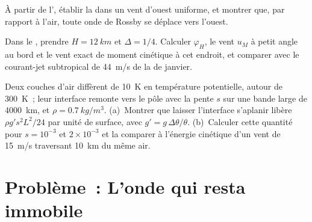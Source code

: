 \begin{exercise}[$\star\star\star$]\label{exo:b3:atmospheric-dynamics:10}
À partir de l', établir la  dans un vent d'ouest uniforme, et montrer
que, par rapport à l'air, toute onde de Rossby se déplace vers l'ouest.
\end{exercise}

\begin{exercise}[$\star\star\star$]\label{exo:b3:atmospheric-dynamics:11}
Dans le , prendre $H = \qty{12}{km}$ et $\Delta = 1/4$. Calculer
$\varphi_H$, le vent $u_M$ à petit angle au bord et le vent exact
de moment cinétique à cet endroit, et comparer avec le courant-jet subtropical de
\qty{44}{m/s} de la  de janvier.
\end{exercise}

\begin{exercise}[$\star\star\star$]\label{exo:b3:atmospheric-dynamics:12}
Deux couches d'air diffèrent de \qty{10}{K} en température potentielle, autour
de \qty{300}{K}~; leur interface remonte vers le pôle avec la pente $s$
sur une bande large de \qty{4000}{km}, et $\rho = \qty{0.7}{kg/m^3}$. (a)~Montrer
que laisser l'interface s'aplanir libère $\rho g' s^2L^2/24$ par unité
de surface, avec $g' = g\,\Delta\theta/\theta$. (b)~Calculer cette quantité pour $s = 10^{-3}$ et
$2\times10^{-3}$ et la comparer à l'énergie cinétique d'un vent de \qty{15}{m/s}
traversant \qty{10}{km} du même air.
\end{exercise}

\section{Problème~: L'onde qui resta immobile}

